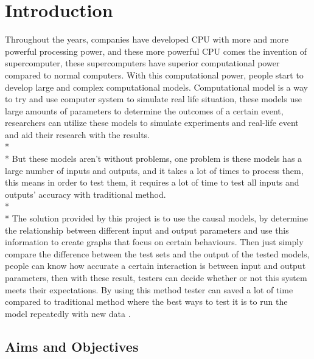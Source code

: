 \chapter{Introduction}

Throughout the years, companies have developed CPU with more and more powerful processing power, and these more powerful CPU comes the invention of supercomputer, these supercomputers have superior computational power compared to normal computers. With this computational power, people start to develop large and complex computational models. Computational model is a way to try and use computer system to simulate real life situation, these models use large amounts of parameters to determine the outcomes of a certain event, researchers can utilize these models to simulate experiments and real-life event \cite{Reference1} and aid their research with the results.\\*\\*
But these models aren’t without problems, one problem is these models has a large number of inputs and outputs, and it takes a lot of times to process them, this means in order to test them, it requires a lot of time to test all inputs and outputs’ accuracy with traditional method. \\*\\*
The solution provided by this project is to use the causal models, by determine the relationship between different input and output parameters and use this information to create graphs that focus on certain behaviours. Then just simply compare the difference between the test sets and the output of the tested models, people can know how accurate a certain interaction is between input and output parameters, then with these result, testers can decide whether or not this system meets their expectations. By using this method tester can saved a lot of time compared to traditional method where the best ways to test it is to run the model repeatedly with new data \cite{Reference2}.   


\section{Aims and Objectives}

